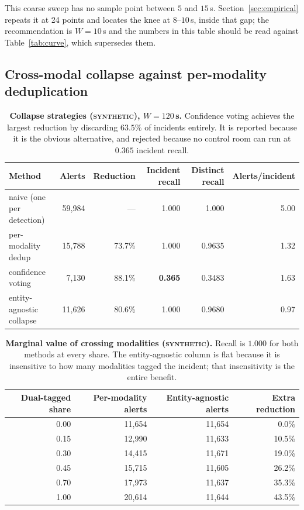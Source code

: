 \documentclass[11pt,a4paper]{article}
\newcommand{\synth}{\textsc{synthetic}}
\begin{document}
This coarse sweep has no sample point between $5$ and $15$\,s.
Section~\ref{sec:empirical} repeats it at 24 points and locates the knee at
$8$--$10$\,s, inside that gap; the recommendation is $W = 10$\,s and the
numbers in this table should be read against Table~\ref{tab:curve}, which
supersedes them.

\subsection{Cross-modal collapse against per-modality deduplication}
\label{sec:crossmodal}

\begin{table}[t]
\centering\small
\begin{tabular}{lrrrrr}
\toprule
\textbf{Method} & \textbf{Alerts} & \textbf{Reduction} & \textbf{Incident recall} & \textbf{Distinct recall} & \textbf{Alerts/incident} \\
\midrule
naive (one per detection) & 59{,}984 & ---     & 1.000 & 1.000 & 5.00 \\
per-modality dedup        & 15{,}788 & 73.7\% & 1.000 & 0.9635 & 1.32 \\
confidence voting         & 7{,}130  & 88.1\% & \textbf{0.365} & 0.3483 & 1.63 \\
entity-agnostic collapse  & 11{,}626 & 80.6\% & 1.000 & 0.9680 & 0.97 \\
\bottomrule
\end{tabular}
\caption{\textbf{Collapse strategies (\synth), $W = 120$\,s.} Confidence voting
achieves the largest reduction by discarding $63.5\%$ of incidents entirely. It is
reported because it is the obvious alternative, and rejected because no control
room can run at $0.365$ incident recall.}
\label{tab:baselines}
\end{table}

\begin{table}[t]
\centering\small
\begin{tabular}{rrrr}
\toprule
\textbf{Dual-tagged share} & \textbf{Per-modality alerts} & \textbf{Entity-agnostic alerts} & \textbf{Extra reduction} \\
\midrule
0.00 & 11{,}654 & 11{,}654 & 0.0\% \\
0.15 & 12{,}990 & 11{,}633 & 10.5\% \\
0.30 & 14{,}415 & 11{,}671 & 19.0\% \\
0.45 & 15{,}715 & 11{,}605 & 26.2\% \\
0.70 & 17{,}973 & 11{,}637 & 35.3\% \\
1.00 & 20{,}614 & 11{,}644 & 43.5\% \\
\bottomrule
\end{tabular}
\caption{\textbf{Marginal value of crossing modalities (\synth).} Recall is
$1.000$ for both methods at every share. The entity-agnostic column is flat
because it is insensitive to how many modalities tagged the incident; that
insensitivity is the entire benefit.}
\label{tab:crossmodal}
\end{table}
\end{document}

